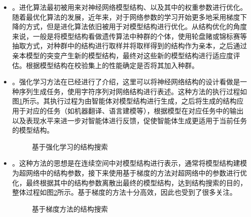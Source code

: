 \begin{itemize}
\vspace{0.5em}
\item {\small{}}。进化算法最初被用来对神经网络模型结构、以及其中的权重参数进行优化。随着最优化算法的发展，近年来，对于网络参数的学习开始更多地采用梯度下降的方式，但是进化算法依旧被用于对模型结构进行优化。从结构优化的角度来说，一般是将模型结构看做遗传算法中种群的个体，使用轮盘赌或锦标赛等抽取方式，对种群中的结构进行取样并将取样得到的结构作为亲本，之后通过亲本模型的突变产生新的模型结构，最终对这些新的模型结构进行适应度评估。根据模型结构在校验集上的性能确定是否将其加入种群。
\vspace{0.5em}
\item 	{\small{}}。强化学习方法在{\chapterthirteen}已经进行了介绍，这里可以将神经网络结构的设计看做是一种序列生成任务，使用字符序列对网络结构进行表述。这种方法的执行过程如图\ref{fig:15-33}所示。其执行过程为由智能体对模型结构进行生成，之后将生成的结构应用于对应的任务（如机器翻译、语言建模等），根据模型在对应任务中的输出以及表现水平来进一步对智能体进行反馈，促使智能体生成更适用于当前任务的模型结构。

\begin{figure}[htp]
\centering

\caption{基于强化学习的结构搜索}
\label{fig:15-33}
\end{figure}

\vspace{0.5em}
\item 	{\small{}}。这种方法的思想是在连续空间中对模型结构进行表示，通常将模型结构建模为超网络中的结构参数，接下来使用基于梯度的方法对超网络中的参数进行优化，最终根据其中的结构参数离散出最终的模型结构，达到结构搜索的目的，整体过程如图\ref{fig:15-34}所示。基于梯度的方法十分高效，因此也受到了很多关注。
\vspace{0.5em}

\begin{figure}[htp]
\centering

\caption{基于梯度方法的结构搜索}
\label{fig:15-34}
\end{figure}

\end{itemize}

